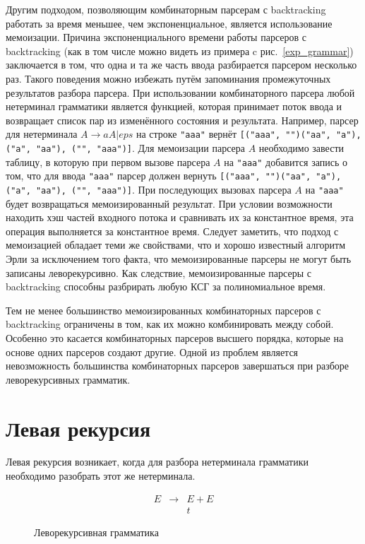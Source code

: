 \documentclass[times]{itmo-student-thesis}
\begin{document}
Другим подходом, позволяющим комбинаторным парсерам с backtracking работать за время меньшее, чем экспоненциальное,
является использование мемоизации. Причина экспоненциального времени работы парсеров с backtracking (как в том числе
можно видеть из примера c рис.~\ref{exp_grammar}) заключается в том, что одна и та же часть ввода разбирается
парсером несколько раз. Такого поведения можно избежать путём запоминания промежуточных результатов разбора парсера.
При использовании комбинаторного парсера любой нетерминал грамматики является функцией, которая принимает поток ввода и
возвращает список пар из изменённого состояния и результата. Например, парсер для нетерминала $A \to aA | eps$ на
строке \lstinline{"aaa"} вернёт \lstinline{[("aaa", "")("aa", "a"), ("a", "aa"), ("", "aaa")]}. Для мемоизации парсера
$A$ необходимо завести таблицу, в которую при первом вызове парсера $A$ на
\lstinline{"aaa"} добавится запись о том, что для ввода \lstinline{"aaa"} парсер должен вернуть
\lstinline{[("aaa", "")("aa", "a"), ("a", "aa"), ("", "aaa")]}. При последующих вызовах парсера $A$ на \lstinline{"aaa"}
будет возвращаться мемоизированный результат. При условии возможности находить хэш частей входного потока и сравнивать
их за константное время, эта операция выполняется за константное время. Следует заметить, что подход с мемоизацией
обладает теми же свойствами, что и хорошо известный алгоритм Эрли\cite{norvig_techniques_1991} за исключением того факта, что
мемоизированные парсеры не могут быть записаны леворекурсивно. Как следствие, мемоизированные парсеры с backtracking
способны разбрирать любую КСГ за полиномиальное время.

Тем не менее большинство мемоизированных комбинаторных парсеров с backtracking ограничены в том, как их можно
комбинировать между собой. Особенно это касается комбинаторных парсеров высшего порядка, которые на основе одних
парсеров создают другие. Одной из проблем является невозможность большинства комбинаторных парсеров завершаться при
разборе леворекурсивных грамматик.

\section{Левая рекурсия}\label{sec:left_recursion}

Левая рекурсия возникает, когда для разбора нетерминала грамматики необходимо разобрать этот же нетерминала. 

\begin{figure}[!h]
    \caption{Леворекурсивная грамматика}\label{leftrec_grammar}
    \[
        \begin{array}{lll}
            E & \to & E+E \\
              &     & t
        \end{array}
    \]
\end{figure}
\end{document}
